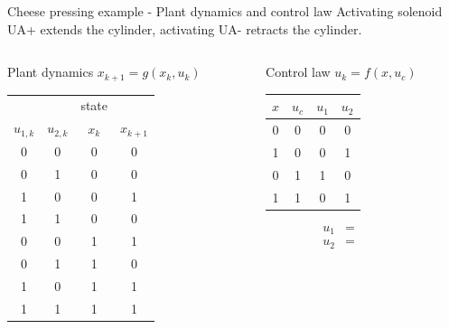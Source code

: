 \documentclass[presentation,aspectratio=1610]{beamer}
\begin{document}
\begin{frame}[label={sec:orgdae007b}]{Cheese pressing example - Plant dynamics and control law}
Activating solenoid UA+ extends the cylinder, activating  UA- retracts the cylinder.
\begin{columns}
\begin{column}{0.5\columnwidth}
\begin{block}{Plant dynamics \(x_{k+1} = g(x_k, u_k)\)}
\begin{center}
\begin{tabular}{|cc|cc|}
\hline
 &  & state & \\
\(u_{1,k}\) & \(u_{2,k}\) & \(x_k\) & \(x_{k+1}\)\\
\hline
0 & 0 & 0 & 0\\
0 & 1 & 0 & 0\\
1 & 0 & 0 & 1\\
1 & 1 & 0 & 0\\
0 & 0 & 1 & 1\\
0 & 1 & 1 & 0\\
1 & 0 & 1 & 1\\
1 & 1 & 1 & 1\\
\hline
\end{tabular}
\end{center}
\end{block}
\end{column}

\begin{column}{0.5\columnwidth}
\begin{block}{Control law \(u_k = f(x, u_c)\)}
\begin{center}
\begin{tabular}{|cc|cc|}
\hline
\(x\) & \(u_{c}\) & \(u_1\) & \(u_2\)\\
\hline
0 & 0 & 0 & 0\\
1 & 0 & 0 & 1\\
0 & 1 & 1 & 0\\
1 & 1 & 0 & 1\\
\hline
\end{tabular}
\end{center}

\begin{align*}
  u_1 &= \qquad\qquad\\
  u_2 &= 
\end{align*}
\end{block}
\end{column}
\end{columns}
\end{frame}
\end{document}
